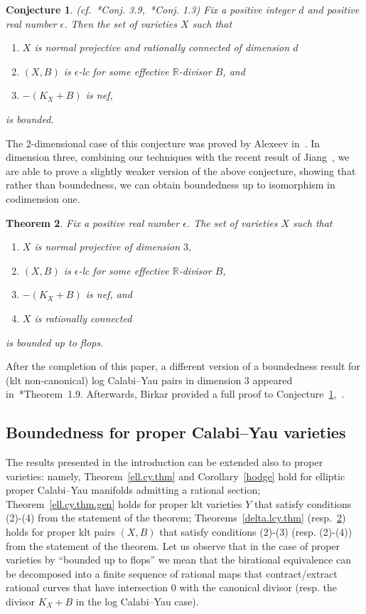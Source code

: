 \documentclass[11pt]{ip-journal}
\newtheorem{theorem}{Theorem}[section]
\newtheorem{conjecture}[theorem]{Conjecture}
\theoremstyle{definition}
\begin{document}
\begin{conjecture}
\label{eps.lcy.conj}
(cf.~\cite{MP}*{Conj. 3.9},~\cite{CDHJS}*{Conj. 1.3})
Fix a positive integer $d$ and positive real number $\epsilon$.
Then the set of varieties $X$ such that
\begin{enumerate}
    \item $X$ is normal projective and rationally connected of dimension $d$ 
    \item $(X, B)$ is $\epsilon$-lc for some effective $\mathbb{R}$-divisor $B$, and 
    \item $-(K_X+B)$ is nef,
\end{enumerate}
is bounded.
\end{conjecture}

The 2-dimensional case of this conjecture was proved by Alexeev in~\cite{MR1298994}.
In dimension three, combining our techniques with the recent result of Jiang~\cite{1904.09642}, we are able to prove a slightly weaker version of the above conjecture, showing that rather than boundedness, we can obtain boundedness up to isomorphism in codimension one.

\begin{theorem}
\label{eps.lcy.3.thm}
Fix a positive real number $\epsilon$.
The set of varieties $X$ such that
\begin{enumerate}
    \item $X$ is normal projective of dimension $3$,
    \item $(X, B)$ is $\epsilon$-lc for some effective $\mathbb{R}$-divisor $B$,
    \item $-(K_X+B)$ is nef, and 
    \item $X$ is rationally connected
\end{enumerate}
is bounded up to flops.
\end{theorem}

After the completion of this paper, a different version of a boundedness result for (klt non-canonical) log Calabi--Yau pairs in dimension 3 appeared in~\cite{2202.05287}*{Theorem~1.9}.
Afterwards, Birkar provided a full proof to Conjecture~\ref{eps.lcy.conj},~\cite{birkar.last}.

\subsection*{Boundedness for proper Calabi--Yau varieties}
The results presented in the introduction can be extended also to proper varieties:
namely, 
Theorem~\ref{ell.cy.thm} 
and
Corollary~\ref{hodge} 
hold for elliptic proper Calabi--Yau manifolds admitting a rational section;
Theorem~\ref{ell.cy.thm.gen}
holds for proper klt varieties $Y$ that satisfy conditions (2)-(4) from the statement of the theorem;
Theorems~\ref{delta.lcy.thm} 
(resp.~\ref{eps.lcy.3.thm}) 
holds for proper klt pairs 
$(X, B)$ 
that satisfy conditions (2)-(3) 
(resp. (2)-(4)) 
from the statement of the theorem.
Let us observe that in the case of proper varieties by ``bounded up to flops'' we mean that the birational equivalence 
can be decomposed into a finite sequence of rational maps that contract/extract rational curves that have intersection 
$0$
with the canonical divisor 
(resp. the divisor $K_X+B$ in the log Calabi--Yau case).
\end{document}
